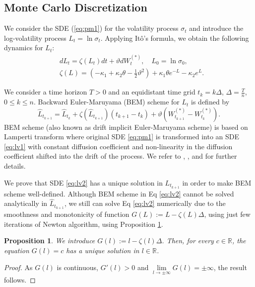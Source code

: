 \documentclass[11pt,a4paper] {article}
\newtheorem{proposition}{Proposition}[section]
\begin{document}
\subsection{Monte Carlo Discretization}\label{sec:discretiz_and_conv}

We consider the SDE (\ref{eq:pm1}) for the volatility process $\sigma_t$ and introduce the log-volatility process $L_{t}=\ln \sigma_{t}$. Applying It\^{o}'s formula, we obtain the following dynamics for $L_{t}$:
\begin{equation} \label{eq:lv1}
\begin{split}
& dL_{t} =\zeta(L_{t})dt + \vartheta dW^{(*)}_{t}, \quad L_{0}=\ln \sigma_{0},\\
& \zeta(L)=\left(-\kappa_{1}+ \kappa_{2}\theta-\frac{1}{2}\vartheta^{2}\right) + \kappa_{1}\theta e^{-L}  - \kappa_{2}e^{L}.
\end{split}
\end{equation}

We consider a time horizon $T>0$ and an equidistant time grid $t_k=k\Delta$, $\Delta=\frac{T}{n}$, $0\le k\le n$. Backward Euler-Maruyama (BEM) scheme for $L_t$ is defined by
\begin{equation} \label{eq:lv2}
\hat L_{t_{k+1}}=\hat L_{t_k}+\zeta\left(\hat L_{t_{k+1}}\right)(t_{k+1}-t_k)+\vartheta\left(W^{(*)}_{t_{k+1}}-W^{(*)}_{t_k}\right).
\end{equation}
BEM scheme (also known as drift implicit Euler-Maruyama scheme) is based on Lamperti transform where original SDE \eqref{eq:pm1} is transformed into an SDE \eqref{eq:lv1} with constant diffusion coefficient and non-linearity in the diffusion coefficient shifted into the drift of the process. We refer to \cite{NeuenSzp2014}, \cite{Alfonsi2}, and \cite{Chassagneux} for further details.


We prove that SDE \eqref{eq:lv2} has a unique solution in $L_{t_{k+1}}$ in order to make BEM scheme well-defined. Although BEM scheme in Eq \eqref{eq:lv2} cannot be solved analytically in $\hat L_{t_{k+1}}$, we still can solve Eq \eqref{eq:lv2} numerically due to the smoothness and monotonicity of function $G(L):=L-\zeta(L)\Delta$, using just few iterations of Newton algorithm, using Proposition \ref{prop:smooth_G}.

\begin{proposition}\label{prop:smooth_G}
We introduce $G(l):=l-\zeta(l)\Delta$. Then, for every $c\in \mathbb{R}$, the equation $G(l)=c$ has a unique solution in $l\in \mathbb{R}$.
\end{proposition}
\begin{proof}
As $G(l)$ is continuous, $G'(l)>0$ and $\lim\limits_{l\to \pm\infty}G(l)=\pm\infty$, the result  follows.
\end{proof}
\end{document}
